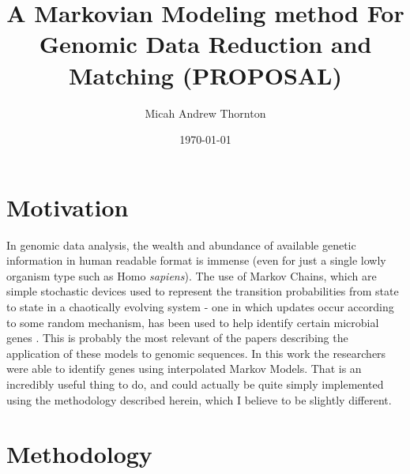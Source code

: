 \documentclass{article}
\title{A Markovian Modeling method For Genomic Data Reduction
and Matching (PROPOSAL)}
\author{Micah Andrew Thornton}
\date{\today}
\begin{document}
 
\begin{titlepage} 
\maketitle{}
\end{titlepage} 

\restoregeometry 

\section{Motivation} 



In genomic data analysis, the wealth and abundance of 
available genetic information in human readable format 
is immense (even for just a single lowly organism type 
such as Homo \textit{sapiens}).  The use of Markov Chains, 
which are simple stochastic devices used to represent the 
transition probabilities from state to state in a chaotically
evolving system - one in which updates occur according to some
random mechanism, has been used to help identify certain 
microbial genes \cite{salzberg1998microbial}.  This is probably
the most relevant of the papers describing the application of 
these models to genomic sequences.  In this work the researchers
were able to identify genes using interpolated Markov Models.  
That is an incredibly useful thing to do, and could actually be 
quite simply implemented using the methodology described herein, 
which I believe to be slightly different. 

\section{Methodology}
\end{document}
